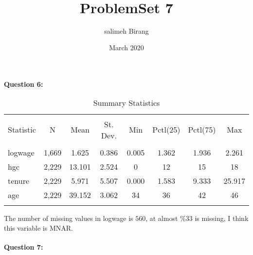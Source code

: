 \documentclass{article}
\title{ProblemSet 7}
\author{salimeh Birang }
\date{March 2020}
\begin{document}
\maketitle

\noindent
\textbf{Question 6:}\\

\begin{table}[!htbp] \centering 
  \caption{Summary Statistics} 
  \label{} 
\begin{tabular}{@{\extracolsep{5pt}}lccccccc} 
\\[-1.8ex]\hline 
\hline \\[-1.8ex] 
Statistic & \multicolumn{1}{c}{N} & \multicolumn{1}{c}{Mean} & \multicolumn{1}{c}{St. Dev.} & \multicolumn{1}{c}{Min} & \multicolumn{1}{c}{Pctl(25)} & \multicolumn{1}{c}{Pctl(75)} & \multicolumn{1}{c}{Max} \\ 
\hline \\[-1.8ex] 
logwage & 1,669 & 1.625 & 0.386 & 0.005 & 1.362 & 1.936 & 2.261 \\ 
hgc & 2,229 & 13.101 & 2.524 & 0 & 12 & 15 & 18 \\ 
tenure & 2,229 & 5.971 & 5.507 & 0.000 & 1.583 & 9.333 & 25.917 \\ 
age & 2,229 & 39.152 & 3.062 & 34 & 36 & 42 & 46 \\ 
\hline \\[-1.8ex] 
\end{tabular} 
\end{table} 
The number of missing values in logwage is $560$, at almost $\%33$ is missing, I think this variable is MNAR. 
\\

\\
\noindent
\textbf{Question 7:}\\
\end{document}
